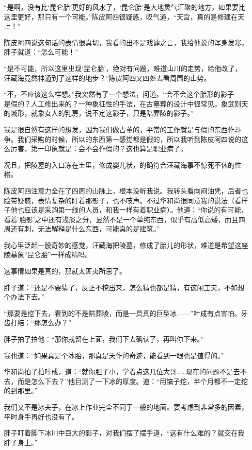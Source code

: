 “是啊，没有比‘昆仑胎’更好的风水了，‘昆仑胎’是大地灵气汇聚的地方，如果要比这里更好，那只有一个可能。”陈皮阿四很疑惑，叹气道，“天宫，真的是修建在天上！”

陈皮阿四说这句话的表情很真切，我看的出不是戏谑之言，我给他说的浑身发寒。胖子就道：“怎么可能！”

“是不可能，所以这里出现‘昆仑胎’，绝对有问题，难道山川的走势，给他改了，汪藏海竟然神通到了这样的地步？”陈皮阿四又四处去看周围的山势。

“不，不应该这么样想。”我突然有了一个想法，问道。“会不会这个胎形的影子——是假的？人工修出来的？一种象征性的手法，在古墓葬的设计中很常见。象武则天的城形，就象女人的乳房，说不定这影子，只是陪葬陵的影子。”

我是很自然有这样的想发，因为我们做古董的，平常的工作就是与假的东西作斗争。我们采购的时候，所以的东西第一感觉都是假的，所以我听到陈皮阿四说的这么厉害，第一印象就是：会不会作假的？这也算是职业病了。

况且，把陵墓的入口冻在土里，修成婴儿状，的确符合汪藏海事不惊死不休的性格。

陈皮阿四注意力全在了四周的山脉上，根本没听我说。我转头看向闷油凭，后者也脸带疑惑，表情复杂的盯着那影子，也不吱声。不过华和尚很同意我的说法（看样子他也应该是采购第一线的人员，和我一样有着职业病）。他道：“你说的有可能，看着‘胎影’之中还有浅淡之分，显然不是一个单纯东西，似乎有高低高矮，而且四周还有刺，无法解释是什么东西，可能真的是建筑。”

我心里泛起一股奇妙的感觉，汪藏海把陵墓，修成了胎儿的形状，难道是希望这座陵墓象“昆仑胎”一样成精吗。

这事情如果是真的，那就太匪夷所思了。

胖子道：“还是不要猜了，反正不挖出来，怎么猜也都是猜，有这闲工夫，不如想个办法下去。”

“那要是挖下去，看到的不是陪葬陵，而是一具真的巨型冰——”叶成有点害怕。牙齿打结：“那怎么办？”

胖子拍了拍他：“那你就留在上面，我们下去确认了，再叫你下来。”

我也道：“如果真是个冰胎，那真是天作的奇迹，能看到一眼也是值得的。”

华和尚拍了拍叶成，道：“就你胆子小，学着点这几位大哥……现在的问题不是去不去，而是怎么下去？”他目测了一下冰的厚度。道：“用镐子挖，半个月都不一定挖的到那里。”

我们又不是冰夫子，在冰上作业完全不同于一般的地面。要考虑到非常多的因素，平时身手再好也没有了。

胖子盯着脚下冰川中巨大的影子，对我们摆了摆手道，“这有什么难的？就交在我胖子身上。”

